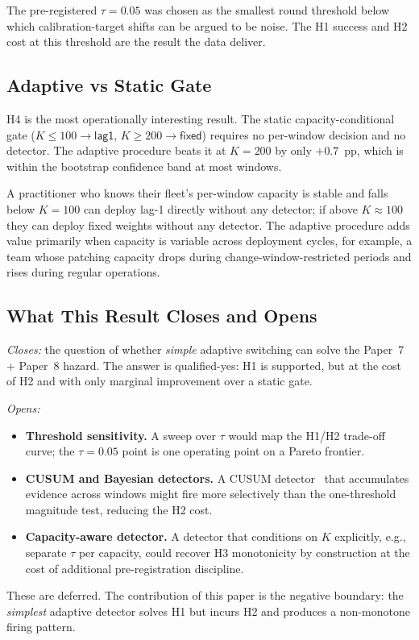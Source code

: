 The pre-registered $\tau = 0.05$ was chosen as the smallest round
threshold below which calibration-target shifts can be argued to be
noise. The H1 success and H2 cost at this threshold are the result
the data deliver.

\subsection{Adaptive vs Static Gate}

H4 is the most operationally interesting result. The static
capacity-conditional gate ($K \leq 100 \to \textsf{lag1}$, $K \geq
200 \to \textsf{fixed}$) requires no per-window decision and no
detector. The adaptive procedure beats it at $K = 200$ by only
$+0.7$~pp, which is within the bootstrap confidence band at most
windows.

A practitioner who knows their fleet's per-window capacity is stable
and falls below $K = 100$ can deploy lag-1 directly without any
detector; if above $K \approx 100$ they can deploy fixed weights
without any detector. The adaptive procedure adds value primarily
when capacity is variable across deployment cycles, for example,
a team whose patching capacity drops during change-window-restricted
periods and rises during regular operations.

\subsection{What This Result Closes and Opens}

\textit{Closes:} the question of whether \textit{simple} adaptive
switching can solve the Paper~7 + Paper~8 hazard. The answer is
qualified-yes: H1 is supported, but at the cost of H2 and with only
marginal improvement over a static gate.

\textit{Opens:}
\begin{itemize}
\item \textbf{Threshold sensitivity.} A sweep over $\tau$ would map
the H1/H2 trade-off curve; the $\tau = 0.05$ point is one operating
point on a Pareto frontier.
\item \textbf{CUSUM and Bayesian detectors.} A CUSUM
detector~\cite{page1954cusum} that accumulates evidence across
windows might fire more selectively than the one-threshold magnitude
test, reducing the H2 cost.
\item \textbf{Capacity-aware detector.} A detector that conditions on
$K$ explicitly, e.g., separate $\tau$ per capacity, could
recover H3 monotonicity by construction at the cost of additional
pre-registration discipline.
\end{itemize}

These are deferred. The contribution of this paper is the negative
boundary: the \textit{simplest} adaptive detector solves H1 but
incurs H2 and produces a non-monotone firing pattern.
